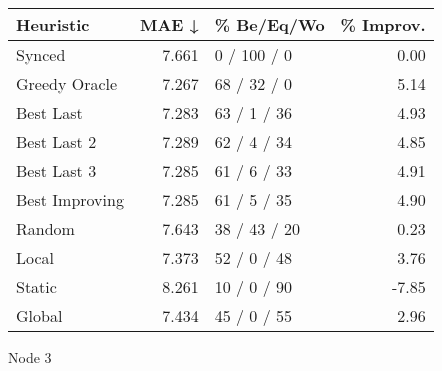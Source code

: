 \begin{tabular}{lrlr}
\toprule
\textbf{Heuristic} & \textbf{MAE ↓} & \textbf{\% Be/Eq/Wo} & \textbf{\% Improv.} \\
\midrule
            Synced &          7.661 &          0 / 100 / 0 &                0.00 \\
     Greedy Oracle &          7.267 &          68 / 32 / 0 &                5.14 \\
         Best Last &          7.283 &          63 / 1 / 36 &                4.93 \\
       Best Last 2 &          7.289 &          62 / 4 / 34 &                4.85 \\
       Best Last 3 &          7.285 &          61 / 6 / 33 &                4.91 \\
    Best Improving &          7.285 &          61 / 5 / 35 &                4.90 \\
            Random &          7.643 &         38 / 43 / 20 &                0.23 \\
             Local &          7.373 &          52 / 0 / 48 &                3.76 \\
            Static &          8.261 &          10 / 0 / 90 &               -7.85 \\
            Global &          7.434 &          45 / 0 / 55 &                2.96 \\
\bottomrule
\end{tabular}
\caption{Node 3}
\label{tab:ds_non_lr01_le2_bs4_3}
